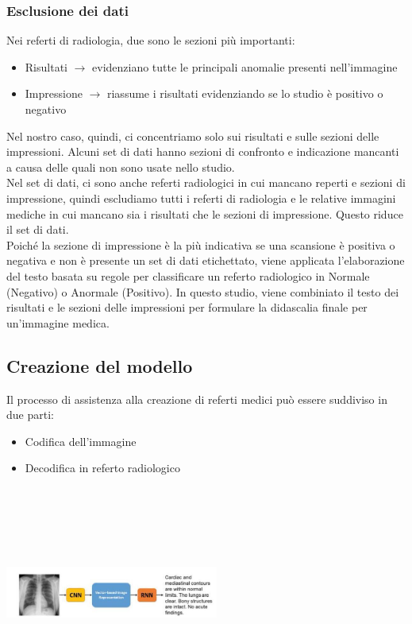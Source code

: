 \documentclass[12pt,a4paper]{report}
\begin{document}
\subsubsection{Esclusione dei dati}
Nei referti di radiologia, due sono le sezioni più importanti:
\begin{itemize}
\item Risultati $\rightarrow$ evidenziano tutte le principali anomalie presenti nell'immagine
\item Impressione $\rightarrow$ riassume i risultati evidenziando se lo studio è positivo o negativo
\end{itemize}
Nel nostro caso, quindi, ci concentriamo solo sui risultati e sulle sezioni delle impressioni.
Alcuni set di dati hanno sezioni di confronto e indicazione mancanti a causa delle quali non sono usate nello studio.\\
Nel set di dati, ci sono anche referti radiologici in cui mancano reperti e sezioni di impressione, quindi escludiamo tutti i referti di radiologia e le relative immagini mediche in cui mancano sia i risultati che le sezioni di impressione.
Questo riduce il set di dati.\\
Poiché la sezione di impressione è la più indicativa se una scansione è positiva o negativa e non è presente un set di dati etichettato, viene applicata l'elaborazione del testo basata su regole per classificare un referto radiologico in Normale (Negativo) o Anormale (Positivo).
In questo studio, viene combiniato il testo dei risultati e le sezioni delle impressioni per formulare la didascalia finale per un'immagine medica.


\subsection{Creazione del modello}
Il processo di assistenza alla creazione di referti medici può essere suddiviso in due parti:
\begin{itemize}
\item Codifica dell’immagine
\item Decodifica in referto radiologico
\end{itemize}

\begin{center}
\includegraphics[width=7cm,height=7cm,keepaspectratio]{Encoder-Decoder}
\end{center}
\end{document}

